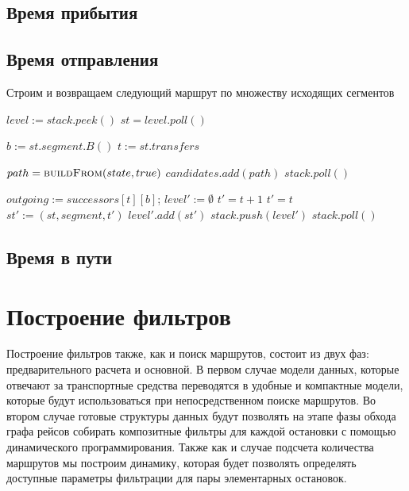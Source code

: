 \subsection{Время прибытия}

\subsection{Время отправления}
\begin{algorithm}[!h]
	\caption{Строим и возвращаем следующий маршрут по множеству исходящих сегментов}\label{lst5}
	\begin{algorithmic}
			\State $level := stack.peek()$ 
				\State $st = level.poll()$ 
				
				\State $b := st.segment.B()$
				\State $t := st.transfers$
				
				 
				\State $path = \Call{buildFrom}{state, true}$ 
				\State $candidates.add(path)$ 
				\State $stack.poll()$
				\EndIf
				\EndIf
				
				\State $outgoing := successors[t][b]$;
				\State $level' := \emptyset$ 
				\State $t' = t + 1$
				\Else
				\State $t' = t$
				\EndIf
				\State $st' := (st, segment, t')$
				\State $level'.add(st')$
				\EndFor
				\State $stack.push(level')$
				\EndIf
			\Else
				\State $stack.poll()$ 
			\EndIf
		\EndWhile
		\EndFunction
	\end{algorithmic}
\end{algorithm}

\FloatBarrier
\subsection{Время в пути}

\section{Построение фильтров}
Построение фильтров также, как и поиск маршрутов, состоит из двух фаз: предварительного расчета и основной. В первом случае модели данных, которые отвечают за транспортные средства переводятся в удобные и компактные модели, которые будут использоваться при непосредственном поиске маршрутов. Во втором случае готовые структуры данных будут позволять на этапе фазы обхода графа рейсов собирать композитные фильтры для каждой остановки с помощью динамического программирования. Также как и случае подсчета количества маршрутов мы построим динамику, которая будет позволять определять доступные параметры фильтрации для пары элементарных остановок.

